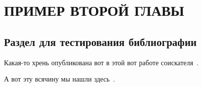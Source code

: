 \chapter{ПРИМЕР ВТОРОЙ ГЛАВЫ}
\section{Раздел для тестирования библиографии}

Какая-то хрень опубликована вот в этой вот работе соискателя~\cite{public_001}.

А вот эту всячину мы нашли здесь~\cite{math_rand_001,rail_book_aizinbud,rail_art_balrol_loco4}.